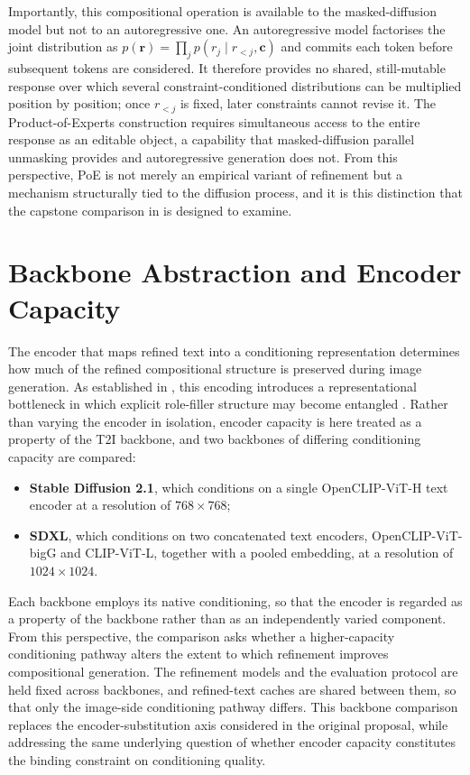 \documentclass[a4paper,twoside,12pt]{report}
\begin{document}
Importantly, this compositional operation is available to the masked-diffusion
model but not to an autoregressive one. An autoregressive model factorises the
joint distribution as \(p(\mathbf{r}) = \prod_j p(r_j \mid r_{<j}, \mathbf{c})\)
and commits each token before subsequent tokens are considered. It therefore
provides no shared, still-mutable response over which several
constraint-conditioned distributions can be multiplied position by position;
once \(r_{<j}\) is fixed, later constraints cannot revise it. The
Product-of-Experts construction requires simultaneous access to the entire
response as an editable object, a capability that masked-diffusion parallel
unmasking provides and autoregressive generation does not. From this
perspective, PoE is not merely an empirical variant of refinement but a
mechanism structurally tied to the diffusion process, and it is this
distinction that the capstone comparison in  is designed to
examine.

\section{Backbone Abstraction and Encoder Capacity}
\label{sec:backbone}

The encoder that maps refined text into a conditioning representation determines
how much of the refined compositional structure is preserved during image
generation. As established in , this encoding introduces a
representational bottleneck in which explicit role-filler structure may become
entangled \citep{radford2021clip}. Rather than varying the encoder in
isolation, encoder capacity is here treated as a property of the T2I backbone,
and two backbones of differing conditioning capacity are compared:

\begin{itemize}
  \item \textbf{Stable Diffusion 2.1}, which conditions on a single
        OpenCLIP-ViT-H text encoder at a resolution of \(768 \times 768\);
  \item \textbf{SDXL}, which conditions on two concatenated text encoders,
        OpenCLIP-ViT-bigG and CLIP-ViT-L, together with a pooled embedding, at
        a resolution of \(1024 \times 1024\).
\end{itemize}

Each backbone employs its native conditioning, so that the encoder is regarded
as a property of the backbone rather than as an independently varied component.
From this perspective, the comparison asks whether a higher-capacity
conditioning pathway alters the extent to which refinement improves
compositional generation. The refinement models and the evaluation protocol are
held fixed across backbones, and refined-text caches are shared between them, so
that only the image-side conditioning pathway differs. This backbone comparison
replaces the encoder-substitution axis considered in the original proposal,
while addressing the same underlying question of whether encoder capacity
constitutes the binding constraint on conditioning quality.
\end{document}
